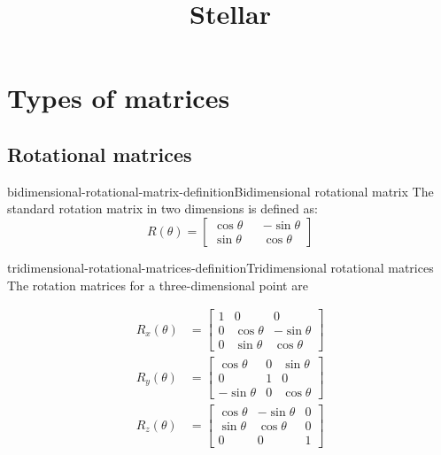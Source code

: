 \documentclass[preview]{standalone}
\begin{document}
\title{Stellar}
\genpage

\section{Types of matrices}

\subsection{Rotational matrices}

\begin{snippetdefinition}{bidimensional-rotational-matrix-definition}{Bidimensional rotational matrix}
    The standard rotation matrix in two dimensions is defined as:
    \[
        R(\theta)=
        \begin{bmatrix} 
            \cos\theta && -\sin\theta \\
            \sin\theta && \cos\theta
        \end{bmatrix}
    \]
\end{snippetdefinition}

\begin{snippetdefinition}{tridimensional-rotational-matrices-definition}{Tridimensional rotational matrices}
    The rotation matrices for a three-dimensional point are

    \begin{align*}
        R_x(\theta)&=
        \begin{bmatrix} 
            1 & 0 & 0 \\
            0 & \cos\theta & -\sin\theta \\
            0 & \sin\theta & \cos\theta
        \end{bmatrix}
        \\
        R_y(\theta)&=
        \begin{bmatrix} 
            \cos\theta & 0 & \sin\theta \\
            0 & 1 & 0 \\
            -\sin\theta & 0 & \cos\theta
        \end{bmatrix}
        \\
        R_z(\theta)&=
        \begin{bmatrix} 
            \cos\theta & -\sin\theta & 0 \\
            \sin\theta & \cos\theta & 0 \\
            0 & 0 & 1
        \end{bmatrix}
    \end{align*}
\end{snippetdefinition}
\end{document}
